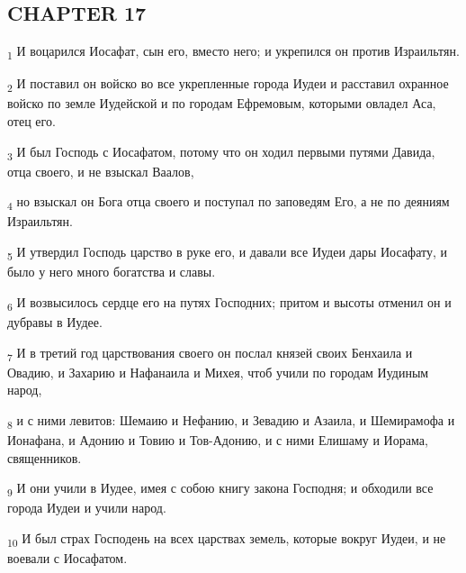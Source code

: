 \subsection{CHAPTER 17}
\begin{tcolorbox}
\textsubscript{1} И воцарился Иосафат, сын его, вместо него; и укрепился он против Израильтян.
\end{tcolorbox}
\begin{tcolorbox}
\textsubscript{2} И поставил он войско во все укрепленные города Иудеи и расставил охранное войско по земле Иудейской и по городам Ефремовым, которыми овладел Аса, отец его.
\end{tcolorbox}
\begin{tcolorbox}
\textsubscript{3} И был Господь с Иосафатом, потому что он ходил первыми путями Давида, отца своего, и не взыскал Ваалов,
\end{tcolorbox}
\begin{tcolorbox}
\textsubscript{4} но взыскал он Бога отца своего и поступал по заповедям Его, а не по деяниям Израильтян.
\end{tcolorbox}
\begin{tcolorbox}
\textsubscript{5} И утвердил Господь царство в руке его, и давали все Иудеи дары Иосафату, и было у него много богатства и славы.
\end{tcolorbox}
\begin{tcolorbox}
\textsubscript{6} И возвысилось сердце его на путях Господних; притом и высоты отменил он и дубравы в Иудее.
\end{tcolorbox}
\begin{tcolorbox}
\textsubscript{7} И в третий год царствования своего он послал князей своих Бенхаила и Овадию, и Захарию и Нафанаила и Михея, чтоб учили по городам Иудиным народ,
\end{tcolorbox}
\begin{tcolorbox}
\textsubscript{8} и с ними левитов: Шемаию и Нефанию, и Зевадию и Азаила, и Шемирамофа и Ионафана, и Адонию и Товию и Тов-Адонию, и с ними Елишаму и Иорама, священников.
\end{tcolorbox}
\begin{tcolorbox}
\textsubscript{9} И они учили в Иудее, имея с собою книгу закона Господня; и обходили все города Иудеи и учили народ.
\end{tcolorbox}
\begin{tcolorbox}
\textsubscript{10} И был страх Господень на всех царствах земель, которые вокруг Иудеи, и не воевали с Иосафатом.
\end{tcolorbox}
